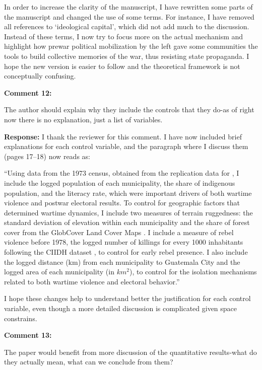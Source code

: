 \documentclass[12pt, a4paper, notitlepage]{article}
\begin{document}
In order to increase the clarity of the manuscript, I have rewritten some parts of the manuscript and changed the use of some terms. For instance, I have removed all references to `ideological capital', which did not add much to the discussion. Instead of these terms, I now try to focus more on the actual mechanism and highlight how prewar political mobilization by the left gave some communities the tools to build collective memories of the war, thus resisting state propaganda. I hope the new version is easier to follow and the theoretical framework is not conceptually confusing.

\vspace{15pt}
\noindent\textbf{Comment 12:}
\begin{displayquote}
The author should explain why they include the controls that they do-as of right now there is no explanation, just a list of variables.
\end{displayquote}

\noindent\textbf{Response:} I thank the reviewer for this comment. I have now included brief explanations for each control variable, and the paragraph where I discuss them (pages 17--18) now reads as:

``Using data from the 1973 census, obtained from the replication data for \citet{Sullivan:2012aa}, I include the logged population of each municipality, the share of indigenous population, and the literacy rate, which were important drivers of both wartime violence and postwar electoral results.
To control for geographic factors that determined wartime dynamics, I include two measures of terrain ruggedness: the standard deviation of elevation within each municipality \citep{Mapzen:2018aa} and the share of forest cover from the GlobCover Land Cover Maps \citep{Arino:2012aa}.
I include a measure of rebel violence before 1978, the logged number of killings for every 1000 inhabitants following the CIIDH dataset \citep{Ball:1999aa}, to control for early rebel presence.
I also include the logged distance (km) from each municipality to Guatemala City and the logged area of each municipality (in $km^2$), to control for the isolation mechanisms related to both wartime violence and electoral behavior.''

I hope these changes help to understand better the justification for each control variable, even though a more detailed discussion is complicated given space constrains.

\vspace{15pt}
\noindent\textbf{Comment 13:}
\begin{displayquote}
The paper would benefit from more discussion of the quantitative results-what do they actually mean, what can we conclude from them?
\end{displayquote}
\end{document}
